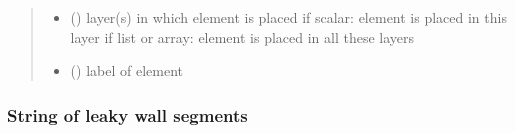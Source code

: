 \documentclass[letterpaper,10pt,english]{sphinxmanual}
\begin{document}
\begin{fulllineitems}
\begin{quote}
\begin{description}
\begin{itemize}
\item {} 
 (\sphinxstyleliteralemphasis{, }) \textendash{} layer(s) in which element is placed
if scalar: element is placed in this layer
if list or array: element is placed in all these layers

\item {} 
 () \textendash{} label of element

\end{itemize}

\end{description}\end{quote}




{\hyperref[\detokenize{linedoublets/leakylinedoubletstring:timml.linedoublet.LeakyLineDoubletString}]{}}



\end{fulllineitems}



\subsubsection{String of leaky wall segments}
\label{\detokenize{linedoublets/leakylinedoubletstring:string-of-leaky-wall-segments}}\label{\detokenize{linedoublets/leakylinedoubletstring::doc}}
\end{document}
